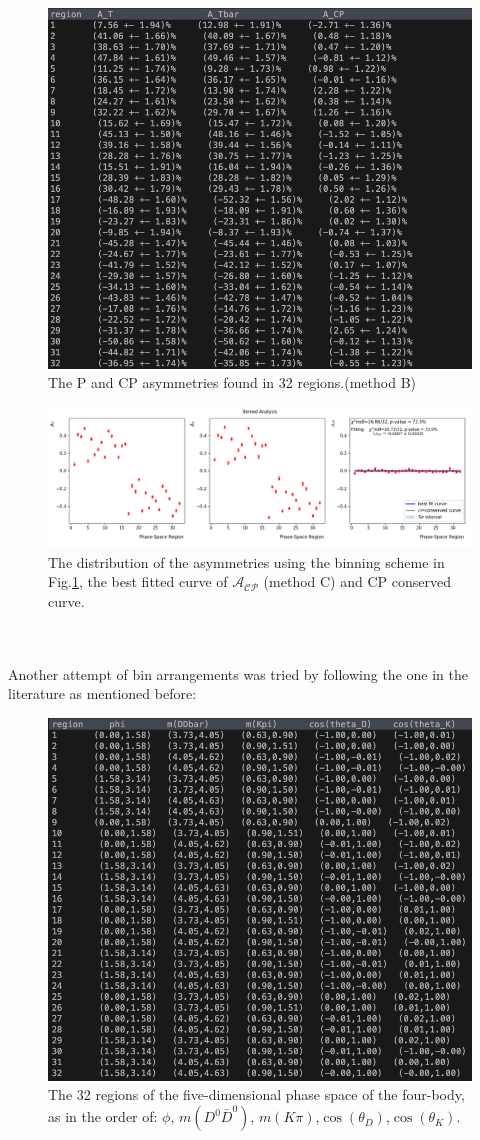\begin{figure}[h]
\center
\includegraphics*[width=0.76\linewidth]{binnedanalysis/phase_space_region_asy2}
\caption{The P and CP asymmetries found in 32 regions.(method B)}
\label{phase_space2}
\end{figure}
\begin{figure}[h]
\center
\includegraphics*[width=0.86\linewidth]{binnedanalysis/Binned_Analysis_factorspd_1E0.0_100000_2}
\caption{The distribution of the asymmetries using the binning scheme in Fig.\ref{phase_space2}, the best fitted curve of $\mathcal{A}_{\mathcal{C}\mathcal{P}}$ (method C) and CP conserved curve.}
\label{binning2}
\end{figure}
\clearpage
\\
\\
Another attempt of bin arrangements was tried by following the one in the literature \autocite{Aaij_2014} as mentioned before:
\begin{figure}[h]
\center
\includegraphics*[width=0.76\linewidth]{binnedanalysis/phase_space_region3}
\caption{The 32 regions of the five-dimensional phase space of the four-body, as in the order of: $\phi$, $m(D^0\bar{D}^0)$, $m(K\pi)$,$\cos(\theta_D)$,$\cos(\theta_K)$.}
\label{phase_space3}
\end{figure}
